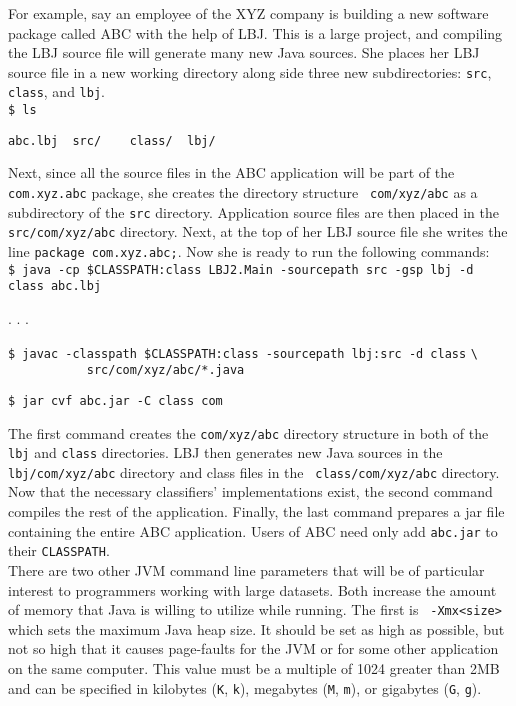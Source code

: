 For example, say an employee of the XYZ company is building a new software
package called ABC with the help of LBJ.  This is a large project, and
compiling the LBJ source file will generate many new Java sources.  She places
her LBJ source file in a new working directory along side three new
subdirectories: {\tt src}, {\tt class}, and {\tt lbj}. \\

\vspace{-.25cm}
{\tt \$ ls}

\verb|abc.lbj  src/    class/  lbj/| \\
\vspace{-.25cm}

\noindent
Next, since all the source files in the ABC application will be part of the
{\tt com.xyz.abc} package, she creates the directory structure {\tt
com/xyz/abc} as a subdirectory of the {\tt src} directory.  Application source
files are then placed in the {\tt src/com/xyz/abc} directory.  Next, at the
top of her LBJ source file she writes the line {\tt package com.xyz.abc;}.
Now she is ready to run the following commands: \\

\vspace{-.25cm}
{\tt \$ java -cp \$CLASSPATH:class LBJ2.Main -sourcepath src -gsp lbj -d class
  abc.lbj}

. . .

{\tt \$ javac -classpath \$CLASSPATH:class -sourcepath lbj:src -d class}
\verb|\| \\
\verb|           src/com/xyz/abc/*.java|

{\tt \$ jar cvf abc.jar -C class com} \\
\vspace{-.25cm}

\noindent
The first command creates the {\tt com/xyz/abc} directory structure in both of
the {\tt lbj} and {\tt class} directories.  LBJ then generates new Java
sources in the {\tt lbj/com/xyz/abc} directory and class files in the {\tt
class/com/xyz/abc} directory.  Now that the necessary classifiers'
implementations exist, the second command compiles the rest of the
application.  Finally, the last command prepares a jar file containing the
entire ABC application.  Users of ABC need only add {\tt abc.jar} to their
{\tt CLASSPATH}. \\

There are two other JVM command line parameters that will be of particular
interest to programmers working with large datasets.  Both increase the amount
of memory that Java is willing to utilize while running.  The first is {\tt
-Xmx<size>} which sets the maximum Java heap size.  It should be set as high
as possible, but not so high that it causes page-faults for the JVM or for
some other application on the same computer.  This value must be a multiple of
1024 greater than 2MB and can be specified in kilobytes ({\tt K}, {\tt k}),
megabytes ({\tt M}, {\tt m}), or gigabytes ({\tt G}, {\tt g}). \\

